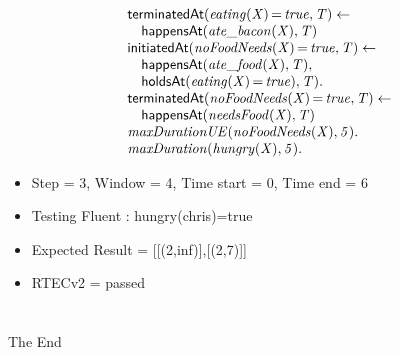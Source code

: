 \documentclass[8pt]{beamer}
\DeclareMathOperator{\val}{=}  %
\def \patsize {}
\def\happensAt{\textsf{\patsize happensAt}}
\def\holdsAt{\textsf{\patsize holdsAt}}
\def\initiatedAt{\textsf{\patsize initiatedAt}}
\def\terminatedAt{\textsf{\patsize terminatedAt}}
\newenvironment{mysplit}%
  {\arraycolsep 0pt \begin{array}{l}}%
  {\end{array}}
\begin{document}
\begin{frame}
\begin{minipage}{0.55\linewidth}
\begin{align*}
\begin{mysplit}
                \terminatedAt\mathit{(eating(X)\val true,T)\leftarrow}\\
                \quad    \happensAt\mathit{(ate\_bacon(X),T)}\\
                \initiatedAt\mathit{(noFoodNeeds(X)\val true,T)\leftarrow}\\
                \quad    \happensAt\mathit{(ate\_food(X),T),}\\
                \quad    \holdsAt\mathit{(eating(X)\val true),T).}\\
                \terminatedAt\mathit{(noFoodNeeds(X)\val true,T)\leftarrow}\\
                \quad    \happensAt\mathit{(needsFood(X),T)}\\
                \mathit{maxDurationUE(noFoodNeeds(X),5).}\\
                \mathit{maxDuration(hungry(X),5).}\\
            \end{mysplit}
        \end{align*}
    \end{minipage}
    \begin{itemize}
        \item  Step = 3, Window = 4, Time start = 0, Time end = 6
        \item Testing Fluent :  hungry(chris)=true
        \item Expected Result = [[(2,inf)],[(2,7)]]
        \item RTECv2 = passed
    \end{itemize}
\end{frame}


\section{}
\begin{frame}
    \Huge{\centerline{The End}}
\end{frame}

\end{document}
